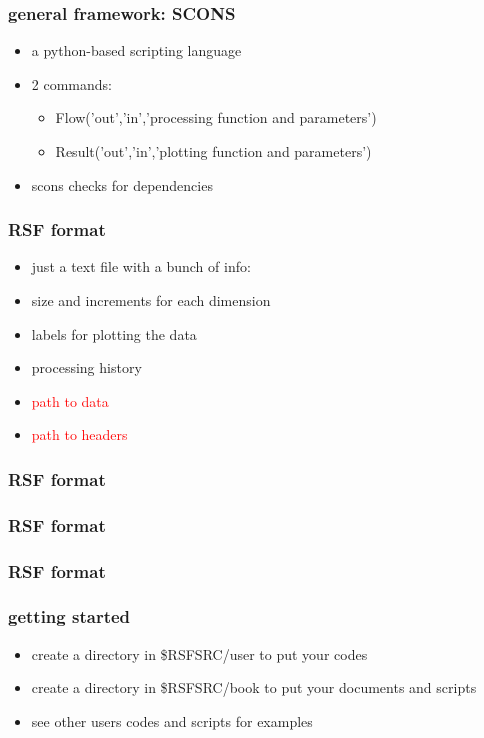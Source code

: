 \begin{frame} \frametitle{general framework: SCONS}
    \begin{itemize}
        \item a python-based scripting language
        \item 2 commands:
        \begin{itemize}
        	\item Flow('out','in','processing function and parameters')
        	\item Result('out','in','plotting function and parameters')
        \end{itemize}
        \item scons checks for dependencies
    \end{itemize}
\end{frame}


\begin{frame} \frametitle{RSF format}
    \begin{itemize}
        \item just a text file with a bunch of info:
        \item size and increments for each dimension
        \item labels for plotting the data
        \item processing history
        \item \textcolor{red}{path to data} 
        \item \textcolor{red}{path to headers}
    \end{itemize}
\end{frame}

\begin{frame} \frametitle{RSF format}
\end{frame}

\begin{frame} \frametitle{RSF format}
\end{frame}

\begin{frame} \frametitle{RSF format}
\end{frame}


\begin{frame} \frametitle{getting started}
    \begin{itemize}
        \item create a directory in \$RSFSRC/user to put your codes 
        \item create a directory in \$RSFSRC/book to put your documents and scripts
        \item see other users codes and scripts for examples
    \end{itemize}
\end{frame}


